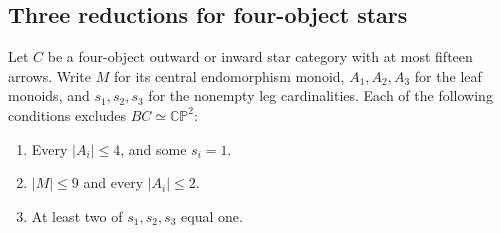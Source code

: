 \subsection{Three reductions for four-object stars}

\begin{proposition}\label{C:fifteen-four-star-prunes}
Let $C$ be a four-object outward or inward star category with
at most fifteen arrows.  Write $M$ for its central endomorphism
monoid, $A_1,A_2,A_3$ for the leaf monoids, and $s_1,s_2,s_3$
for the nonempty leg cardinalities.  Each of the following
conditions excludes $BC\simeq\mathbb {CP}^2$:
\begin{enumerate}
\item Every $|A_i|\leq4$, and some $s_i=1$.
\item $|M|\leq9$ and every $|A_i|\leq2$.
\item At least two of $s_1,s_2,s_3$ equal one.
\end{enumerate}
\end{proposition}

